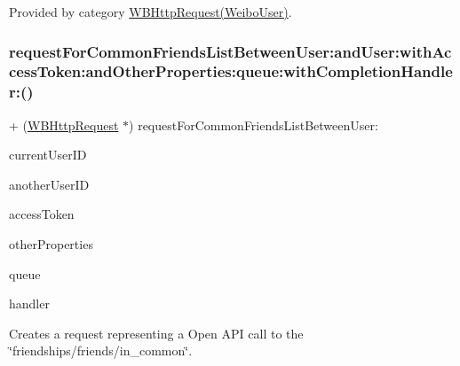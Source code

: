 Provided by category \mbox{\hyperlink{category_w_b_http_request_07_weibo_user_08_a869234d6cc01353dcfc8f0f47ad06f5c}{W\+B\+Http\+Request(\+Weibo\+User)}}.

\mbox{\label{interface_w_b_http_request_a869234d6cc01353dcfc8f0f47ad06f5c}} 
\subsubsection{\texorpdfstring{request\+For\+Common\+Friends\+List\+Between\+User\+:and\+User\+:with\+Access\+Token\+:and\+Other\+Properties\+:queue\+:with\+Completion\+Handler\+:()}{requestForCommonFriendsListBetweenUser:andUser:withAccessToken:andOtherProperties:queue:withCompletionHandler:()}\hspace{0.1cm}{\footnotesize\ttfamily [3/3]}}
{\footnotesize\ttfamily + (\mbox{\hyperlink{interface_w_b_http_request}{W\+B\+Http\+Request}} $\ast$) request\+For\+Common\+Friends\+List\+Between\+User\+: \begin{DoxyParamCaption}\item[{(N\+S\+String $\ast$)}]{current\+User\+ID }\item[{andUser:(N\+S\+String $\ast$)}]{another\+User\+ID }\item[{withAccessToken:(N\+S\+String $\ast$)}]{access\+Token }\item[{andOtherProperties:(N\+S\+Dictionary $\ast$)}]{other\+Properties }\item[{queue:(N\+S\+Operation\+Queue $\ast$)}]{queue }\item[{withCompletionHandler:(W\+B\+Request\+Handler)}]{handler }\end{DoxyParamCaption}}

Creates a request representing a Open A\+PI call to the \char`\"{}friendships/friends/in\+\_\+common\char`\"{}.

